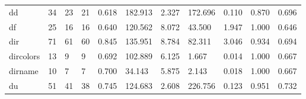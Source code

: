 \begin{longtable}{lp{1.2cm}p{1.2cm}p{1.2cm}p{1.2cm}p{1.2cm}p{1.2cm}p{1.2cm}p{1.2cm}p{1.2cm}p{1.2cm}}
dd        &                           34 &                 23 &                                21 &                                      0.618 &                                182.913 &                                        2.327 &                           172.696 &                                   0.110 &                              0.870 &                                              0.696 \\
df        &                           25 &                 16 &                                16 &                                      0.640 &                                120.562 &                                        8.072 &                            43.500 &                                   1.947 &                              1.000 &                                              0.646 \\
dir       &                           71 &                 61 &                                60 &                                      0.845 &                                135.951 &                                        8.784 &                            82.311 &                                   3.046 &                              0.934 &                                              0.694 \\
dircolors &                           13 &                  9 &                                 9 &                                      0.692 &                                102.889 &                                        6.125 &                             1.667 &                                   0.014 &                              1.000 &                                              0.667 \\
dirname   &                           10 &                  7 &                                 7 &                                      0.700 &                                 34.143 &                                        5.875 &                             2.143 &                                   0.018 &                              1.000 &                                              0.667 \\
du        &                           51 &                 41 &                                38 &                                      0.745 &                                124.683 &                                        2.608 &                           226.756 &                                   0.123 &                              0.951 &                                              0.732 \\

\end{longtable}
